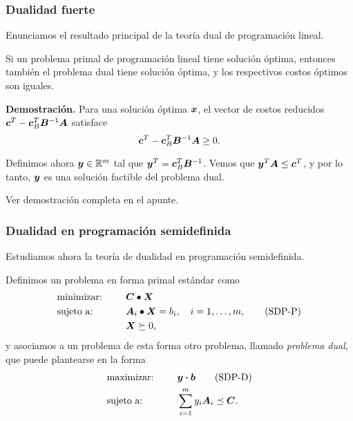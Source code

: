 \documentclass[aspectratio=169,12pt,spanish]{beamer}
\begin{document}
\begin{frame}
\frametitle{Dualidad fuerte}
Enunciamos el resultado principal de la teoría dual de programación lineal.

\begin{theorem}
Si un problema primal de programación lineal tiene solución óptima, entonces también el problema dual tiene solución óptima, y los respectivos costos óptimos son iguales.
\end{theorem}

\textbf{Demostración.}
Para una solución óptima $\bm{x}$, el vector de costos reducidos $\bm{c}^T - \bm{c}_B^T \bm{B}^{-1} \bm{A}$ satisface
$$\bm{c}^T - \bm{c}_B^T \bm{B}^{-1} \bm{A} \ge 0.$$

Definimos ahora $\bm{y} \in \mathbb{R}^m$ tal que $\bm{y}^T = \bm{c}_B^T \bm{B}^{-1}$. Vemos que $\bm{y}^T \bm{A}  \le \bm{c}^T$, y por lo tanto, $\bm{y}$ es una solución factible del problema dual.

Ver demostración completa en el apunte.

\end{frame}


\begin{frame}
\frametitle{Dualidad en programación semidefinida}

Estudiamos ahora la teoría de dualidad en programación semidefinida.

Definimos un problema en forma primal estándar como
\begin{alignat}{2}
  & \text{minimizar: } & \quad & \bm{C} \bullet \bm{X} \nonumber \\
  & \text{sujeto a: }  \quad & & \bm{A}_i \bullet \bm{X} = b_i, \quad i = 1, \dots, m, \tag{SDP-P}\label{sdp-p}\\
   && & \bm{X} \succeq 0, \nonumber
\end{alignat}
y asociamos a un problema de esta forma otro problema, llamado \emph{problema dual}, que puede plantearse en la forma
\begin{alignat}{2}
  & \text{maximizar: } &   \quad & \bm{y} \boldsymbol{\cdot} \bm{b} \tag{SDP-D}\label{sdp-d} \\
  & \text{sujeto a: } & \quad & \sum_{i=1}^m y_i  \bm{A}_i \preceq \bm{C}. \nonumber
\end{alignat}


\end{frame}

\end{document}
